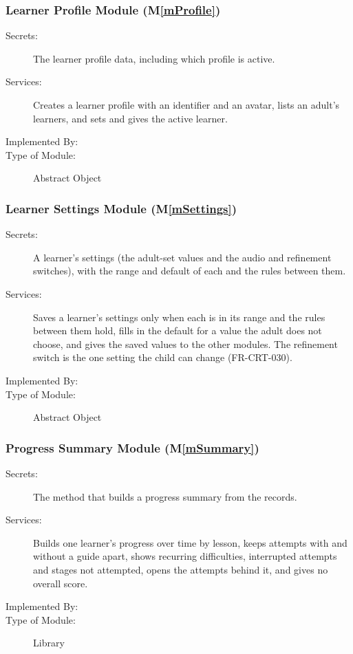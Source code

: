\documentclass[12pt, titlepage]{article}
\newcommand{\mref}[1]{M\ref{#1}}
\begin{document}
\subsubsection{Learner Profile Module (\mref{mProfile})}

\begin{description}
\item[Secrets:] The learner profile data, including which profile is
  active.
\item[Services:] Creates a learner profile with an identifier and an avatar,
  lists an adult's learners, and sets and gives the active learner.
\item[Implemented By:] \progname{}
\item[Type of Module:] Abstract Object
\end{description}

\subsubsection{Learner Settings Module (\mref{mSettings})}

\begin{description}
\item[Secrets:] A learner's settings (the adult-set values and the audio and
  refinement switches), with the range and default of each and the rules
  between them.
\item[Services:] Saves a learner's settings only when each is in its range and
  the rules between them hold, fills in the default for a value the adult does
  not choose, and gives the saved values to the other modules. The refinement
  switch is the one setting the child can change (FR-CRT-030).
\item[Implemented By:] \progname{}
\item[Type of Module:] Abstract Object
\end{description}

\subsubsection{Progress Summary Module (\mref{mSummary})}

\begin{description}
\item[Secrets:] The method that builds a progress summary from the records.
\item[Services:] Builds one learner's progress over time by lesson, keeps
  attempts with and without a guide apart, shows recurring difficulties,
  interrupted attempts and stages not attempted, opens the attempts behind it,
  and gives no overall score.
\item[Implemented By:] \progname{}
\item[Type of Module:] Library
\end{description}
\end{document}
